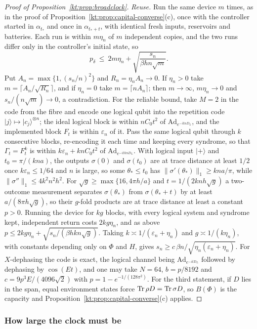 \begin{proof}[Proof of Proposition~\ref{kt:prop:broadclock}]
\emph{Reuse.} Run the same device $m$ times, as in the proof of Proposition~\ref{kt:prop:capital-converse}(c), once with the controller started in $\alpha_{t_*}$ and once in $\alpha_{t_*+t}$, with identical fresh inputs, reservoirs and batteries. Each run is within $m\eta_n$ of $m$ independent copies, and the two runs differ only in the controller's initial state, so
\[
p_\delta\ \le\ 2m\eta_n+\sqrt{\frac{s_n}{\beta hn\sqrt m}}.
\]
Put $A_n=\max\{1,(s_n/n)^2\}$ and $R_n=\eta_nA_n\to0$. If $\eta_n>0$ take $m=\lceil A_n/\sqrt{R_n}\rceil$, and if $\eta_n=0$ take $m=\lceil nA_n\rceil$; then $m\to\infty$, $m\eta_n\to0$ and $s_n/(n\sqrt m)\to0$, a contradiction. For the reliable bound, take $M=2$ in the code from the fibre and encode one logical qubit into the repetition code $|j\rangle\mapsto|c_j\rangle^{\otimes n}$; the ideal logical block is within $nC_0t^2$ of $\mathrm{Ad}_{e^{-itnD_L}}$, and the implemented block $F_t$ is within $\varepsilon_n$ of it. Pass the same logical qubit through $k$ consecutive blocks, re-encoding it each time and keeping every syndrome, so that $\Gamma_t=F_t^k$ is within $k\varepsilon_n+knC_0t^2$ of $\mathrm{Ad}_{e^{-itknD_L}}$. With logical input $|+\rangle$ and $t_0=\pi/(kna)$, the outputs $\sigma(0)$ and $\sigma(t_0)$ are at trace distance at least $1/2$ once $k\varepsilon_n\le1/64$ and $n$ is large, so some $\theta_*\le t_0$ has $\|\sigma'(\theta_*)\|_1\ge kna/\pi$, while $\|\sigma''\|_1\le4k^2n^2h^2$. For $\sqrt g\ge\max\{16,4\pi h/a\}$ and $t=1/(2knh\sqrt g)$ a two-outcome measurement separates $\sigma(\theta_*)$ from $\sigma(\theta_*+t)$ by at least $a/(8\pi h\sqrt g)$, so their $g$-fold products are at trace distance at least a constant $p>0$. Running the device for $kg$ blocks, with every logical system and syndrome kept, independent return costs $2kg\eta_n$, and as above $p\le2kg\eta_n+\sqrt{s_n/(\beta hkn\sqrt g)}$. Taking $k\asymp1/(\varepsilon_n+\eta_n)$ and $g\asymp1/(k\eta_n)$, with constants depending only on $\Phi$ and $H$, gives $s_n\ge c\,\beta n/\sqrt{\eta_n(\varepsilon_n+\eta_n)}$. For $X$-dephasing the code is exact, the logical channel being $\mathrm{Ad}_{e^{-itD_L}}$ followed by dephasing by $\cos(Et)$, and one may take $N=64$, $b=p/8192$ and $c=9p^3E/(4096\sqrt2)$ with $p=1-e^{-1/(128\pi^2)}$. For the third statement, if $D$ lies in the span, equal environment states force $\operatorname{Tr}\rho D=\operatorname{Tr}\sigma D$, so $B(\Phi)$ is the capacity and Proposition~\ref{kt:prop:capital-converse}(c) applies.
\end{proof}

\subsubsection{How large the clock must be}\label{kt:pf:clocksize}

